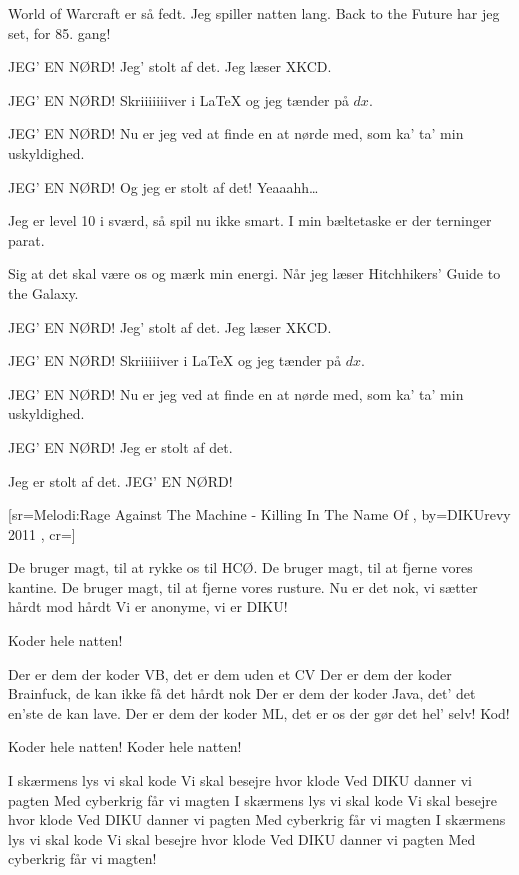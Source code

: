 \documentclass[pdftex,12pt]{article}
\begin{document}
\begin{songs}{}
\endverse
\beginverse
World of Warcraft er så fedt.
Jeg spiller natten lang.
Back to the Future har jeg set,
for 85. gang!

\endverse
\beginverse
JEG’ EN NØRD!
Jeg’ stolt af det.
Jeg læser XKCD.

\endverse
\beginverse
JEG’ EN NØRD!
Skriiiiiiiver i \LaTeX
og jeg tænder på $dx$.

\endverse
\beginverse
JEG’ EN NØRD!
Nu er jeg ved
at finde en at nørde med,
som ka’ ta’ min uskyldighed.

\endverse
\beginverse
JEG’ EN NØRD!
Og jeg er stolt af det!
Yeaaahh…

\endverse
\beginverse
Jeg er level 10 i sværd,
så spil nu ikke smart.
I min bæltetaske er
der terninger parat.

\endverse
\beginverse
Sig at det skal være os
og mærk min energi.
Når jeg læser Hitchhikers’
Guide to the Galaxy.

\endverse
\beginverse
JEG’ EN NØRD!
Jeg’ stolt af det.
Jeg læser XKCD.

\endverse
\beginverse
JEG’ EN NØRD!
Skriiiiiver i \LaTeX
og jeg tænder på $dx$.

\endverse
\beginverse
JEG’ EN NØRD!
Nu er jeg ved
at finde en at nørde med,
som ka’ ta’ min uskyldighed.

\endverse
\beginverse
JEG’ EN NØRD!
Jeg er stolt af det.

\endverse
\beginverse
Jeg er stolt af det.
JEG’ EN NØRD!

\endverse
\endsong



[sr={Melodi:Rage Against The Machine - Killing In The Name Of}
,
by={DIKUrevy 2011}
,
cr={}]\hypertarget{Koder Hele Natten}{}
\label{song61}

\beginverse
De bruger magt, til at rykke os til HCØ.
De bruger magt, til at fjerne vores kantine.
De bruger magt, til at fjerne vores rusture.
Nu er det nok, vi sætter hårdt mod hårdt
Vi er anonyme, vi er DIKU!

\endverse
\beginverse
Koder hele natten!

\endverse
\beginverse
Der er dem der koder VB, det er dem uden et CV
Der er dem der koder Brainfuck, de kan ikke få det hårdt nok
Der er dem der koder Java, det' det en'ste de kan lave.
Der er dem der koder ML, det er os der gør det hel' selv!
Kod!

\endverse
\beginverse
Koder hele natten!
Koder hele natten!

\endverse
\beginverse
I skærmens lys vi skal kode
Vi skal besejre hvor klode
Ved DIKU danner vi pagten
Med cyberkrig får vi magten
I skærmens lys vi skal kode
Vi skal besejre hvor klode
Ved DIKU danner vi pagten
Med cyberkrig får vi magten
I skærmens lys vi skal kode
Vi skal besejre hvor klode
Ved DIKU danner vi pagten
Med cyberkrig får vi magten!


\end{songs}
\end{document}
